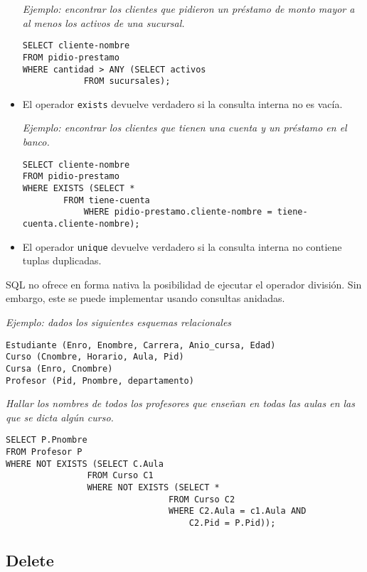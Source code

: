 \documentclass[a4paper, twoside]{article}
\begin{document}
\begin{itemize}
\emph{Ejemplo: encontrar los clientes que pidieron un préstamo de
monto mayor a al menos los activos de una sucursal.}


\begin{lstlisting}
SELECT cliente-nombre
FROM pidio-prestamo
WHERE cantidad > ANY (SELECT activos
			FROM sucursales);
\end{lstlisting}


\item El operador \texttt{exists} devuelve verdadero si la consulta interna
no es vacía.


\emph{Ejemplo: encontrar los clientes que tienen una cuenta y un préstamo
en el banco.}


\begin{lstlisting}
SELECT cliente-nombre
FROM pidio-prestamo
WHERE EXISTS (SELECT *
		FROM tiene-cuenta
            WHERE pidio-prestamo.cliente-nombre = tiene-cuenta.cliente-nombre);
\end{lstlisting}


\item El operador \texttt{unique} devuelve verdadero si la consulta interna
no contiene tuplas duplicadas.
\end{itemize}
SQL no ofrece en forma nativa la posibilidad de ejecutar el operador
división. Sin embargo, este se puede implementar usando consultas
anidadas.

\emph{Ejemplo: dados los siguientes esquemas relacionales}

\begin{lstlisting}
Estudiante (Enro, Enombre, Carrera, Anio_cursa, Edad) 
Curso (Cnombre, Horario, Aula, Pid) 
Cursa (Enro, Cnombre) 
Profesor (Pid, Pnombre, departamento) 
\end{lstlisting}


\emph{Hallar los nombres de todos los profesores que enseñan en todas
las aulas en las que se dicta algún curso.}

\begin{lstlisting}
SELECT P.Pnombre 
FROM Profesor P 
WHERE NOT EXISTS (SELECT C.Aula                   
				FROM Curso C1                  
				WHERE NOT EXISTS (SELECT *                                    
								FROM Curso C2                                    
								WHERE C2.Aula = c1.Aula AND      
                                    C2.Pid = P.Pid));
\end{lstlisting}



\subsection{Delete}
\end{document}
